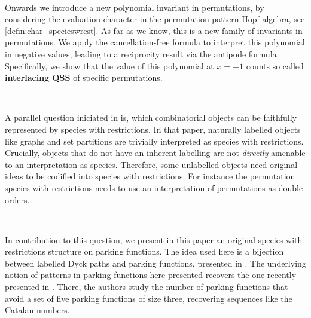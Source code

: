 \documentclass[12pt, reqno]{amsart}
\theoremstyle{definition}
\begin{document}
\

Onwards we introduce a new polynomial invariant in permutations, by considering the evaluation character in the permutation pattern Hopf algebra, see \cref{defin:char_specieswrest}.
As far as we know, this is a new family of invariants in permutations.
We apply the cancellation-free formula to interpret this polynomial in negative values, leading to a reciprocity result via the antipode formula.
Specifically, we show that the value of this polynomial at $x = -1$ counts so called \textbf{interlacing QSS} of specific permutations.

\

A parallel question iniciated in \cite{Penaguiao2020} is, which combinatorial objects can be faithfully represented by species with restrictions.
In that paper, naturally labelled objects like graphs and set partitions are trivially interpreted as species with restrictions.
Crucially, objects that do not have an inherent labelling are not \textit{directly} amenable to an interpretation as species.
Therefore, some unlabelled objects need original ideas to be codified into species with restrictions. 
For instance the permutation species with restrictions needs to use an interpretation of permutations as double orders.

\

In contribution to this question, we present in this paper an original species with restrictions structure on parking functions.
The idea used here is a bijection between labelled Dyck paths and parking functions, presented in \cite{Loehr,BGLPV2021}.
The underlying notion of patterns in parking functions here presented recovers the one recently presented in \cite{adeniran2022pattern}.
There, the authors study the number of parking functions that avoid a set of five parking functions of size three, recovering sequences like the Catalan numbers.

\
\end{document}
